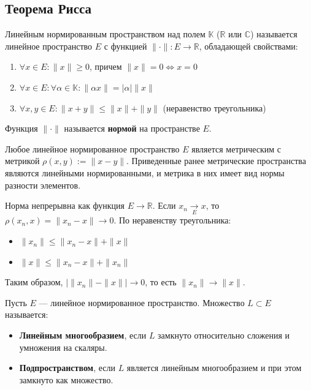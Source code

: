 
\label{seventh-bilet}
\subsection{Теорема Рисса}
\begin{definition}
	Линейным нормированным пространством над полем $\mathbb{K}$ ($\mathbb{R}$ или $\mathbb{C}$) называется линейное пространство $E$ с функцией $\|\cdot\| : E \to \mathbb{R}$, обладающей свойствами:
	\begin{enumerate}
		\item $\forall x \in E: \|x\| \geqslant 0$, причем $\|x\| = 0 \Leftrightarrow x = 0$
		\item $\forall x \in E: \forall \alpha \in \mathbb{K}: \|\alpha x\| = |\alpha|\|x\|$
		\item $\forall x, y \in E: \|x + y\| \leqslant \|x\| + \|y\|$ (неравенство треугольника)
	\end{enumerate}
	Функция $\|\cdot\|$ называется \textbf{нормой} на пространстве $E$.
\end{definition}

\begin{example}
	Любое линейное нормированное пространство $E$ является метрическим с метрикой $\rho(x, y) := \|x - y\|$. Приведенные ранее метрические пространства являются линейными нормированными, и метрика в них имеет вид нормы разности элементов.
\end{example}

\begin{remark}
	Норма непрерывна как функция $E \to \mathbb{R}$. Если $x_n \xrightarrow[E]{} x$, то $\rho(x_n, x) = \|x_n - x\| \to 0$. По неравенству треугольника:
	\begin{itemize}
		\item $\|x_n\| \leqslant \|x_n - x\| + \|x\|$
		\item $\|x\| \leqslant \|x_n - x\| + \|x_n\|$
	\end{itemize}
	Таким образом, $\left|\|x_n\| - \|x\|\right| \to 0$, то есть $\|x_n\| \to \|x\|$.
\end{remark}

\begin{definition}
	Пусть $E$ --- линейное нормированное пространство. Множество $L \subset E$ называется:
	\begin{itemize}
		\item \textbf{Линейным многообразием}, если $L$ замкнуто относительно сложения и умножения на скаляры.
		\item \textbf{Подпространством}, если $L$ является линейным многообразием и при этом замкнуто как множество.
	\end{itemize}
\end{definition}

